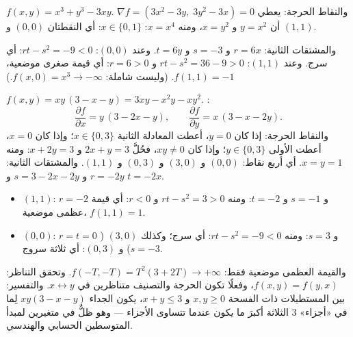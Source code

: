 \begin{example}\label{ex:b1:multivar:extrema}
$f(x,y) = x^3 + y^3 - 3xy$. والنقاط الحرجة: يعطي $\nabla f = (3x^2 -
3y,\; 3y^2 - 3x) = 0$ أن $y = x^2$ و $x = y^2$، ومنه $x = x^4$:
$x \in \{0, 1\}$: أي النقطتان $(0,0)$ و $(1,1)$.

والمشتقات الثانية: $r = 6x$ و $s = -3$ و $t = 6y$. وعند $(0,0)$: $rt -
s^2 = -9 < 0$: أي سرج. وعند $(1,1)$: $rt - s^2 = 36 - 9 > 0$ و $r = 6
> 0$: أي قيمة صغرى موضعية، $f(1,1) = -1$. (وليست شاملة: $f(x, 0) = x^3 \to
-\infty$.)
\end{example}

\begin{example}
\label{ex:b1:multivar:fourpoints}
$f(x, y) = xy\,(3 - x - y) = 3xy - x^2y - xy^2$. :
\[
\frac{\partial f}{\partial x} = y\,(3 - 2x - y),
\qquad
\frac{\partial f}{\partial y} = x\,(3 - x - 2y).
\]
والنقاط الحرجة: إذا كان $y = 0$، أعطت المعادلة الثانية $x \in
\{0, 3\}$؛ وإذا كان $x = 0$، أعطت الأولى $y \in \{0, 3\}$؛ وإذا كان $xy
\neq 0$، فحُلَّ $2x + y = 3$ و $x + 2y = 3$: ومنه $x = y = 1$. أي أربع
نقاط: $(0,0)$ و $(3,0)$ و $(0,3)$ و $(1,1)$. والمشتقات الثانية:
$r = -2y$ و $s = 3 - 2x - 2y$ و $t = -2x$.
\begin{itemize}
  \item $(1,1)$: $r = -2$ و $s = -1$ و $t = -2$: ومنه $rt - s^2 = 3 >
        0$ و $r < 0$: أي قيمة عظمى موضعية، $f(1,1) = 1$.
  \item $(0,0)$: $r = t = 0$ و $s = 3$: ومنه $rt - s^2 = -9 < 0$:
        أي سرج؛ وكذلك $(3, 0)$ ($s = -3$) و $(0, 3)$: أي ثلاثة
        سروج.
\end{itemize}
والقيمة العظمى موضعية فقط: $f(-T, -T) = T^2(3 + 2T) \to
+\infty$. وتحقق التناظر: $f(x, y) = f(y, x)$، وفعلًا تكون
 الحرجة والتصنيف متناظرين في $x
\leftrightarrow y$. والتفسير: بين المستطيلات ذات الفسحة
$x, y \geq 0$ و $x + y \leq 3$، يكون الجداء $xy(3 - x - y)$ لِما في «أجزاء»
$3$ الثلاثة أكبرَ ما يكون عندما تتساوى الأجزاء
--- وهو ظلٌّ في متغيرين لمبدأ المتوسطين الحسابي والهندسي.
\end{example}

